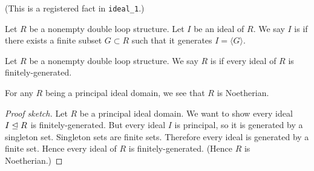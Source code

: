 (This is a registered fact in \texttt{ideal\_1}.)

\begin{definition}
Let $R$ be a nonempty double loop structure.
Let $I$ be an ideal of $R$.
We say $I$ is  if there exists a finite
subset $G\subset R$ such that it generates $I=\langle G\rangle$.
\end{definition}

\begin{definition}
Let $R$ be a nonempty double loop structure.
We say $R$ is  if every ideal of $R$ is finitely-generated.
\end{definition}

\begin{theorem}
For any $R$ being a principal ideal domain,
we see that $R$ is Noetherian.
\end{theorem}

\begin{proof}[Proof sketch]
Let $R$ be a principal ideal domain. We want to show every ideal
$I\mathrel{\trianglelefteq} R$ is finitely-generated. But every ideal $I$ is principal,
so it is generated by a singleton set. Singleton sets are finite sets.
Therefore every ideal is generated by a finite set. Hence every ideal
of $R$ is finitely-generated. (Hence $R$ is Noetherian.)
\end{proof}